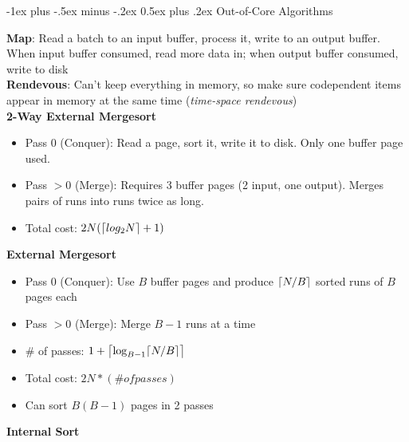 \documentclass[10pt,landscape]{article}
\makeatletter
\DeclarePairedDelimiter{\ceil}{\lceil}{\rceil}
\renewcommand{\section}{\@startsection{section}{1}{0mm}%
                                {-1ex plus -.5ex minus -.2ex}%
                                {0.5ex plus .2ex}%
                                {\normalfont\large\bfseries}}
\makeatother
\begin{document}
\raggedright
\footnotesize
\begin{multicols}{3}


\setlength{\premulticols}{1pt}
\setlength{\postmulticols}{1pt}
\setlength{\multicolsep}{1pt}
\setlength{\columnsep}{2pt}


\section{Out-of-Core Algorithms}

\textbf{Map}: Read a batch to an input buffer, process it, write to an output buffer. When input buffer consumed, read more data in; when output buffer consumed, write to disk \\
\textbf{Rendevous}: Can't keep everything in memory, so make sure codependent items appear in memory at the same time (\textit{time-space rendevous}) \\

\textbf{2-Way External Mergesort}

\begin{itemize}
    \item Pass 0 (Conquer): Read a page, sort it, write it to disk. Only one buffer page used.
    \item Pass $>0$ (Merge): Requires 3 buffer pages (2 input, one output). Merges pairs of runs into runs twice as long.
    \item Total cost: $2N(\ceil*{log_2 N} + 1)$
\end{itemize}


\textbf{External Mergesort}

\begin{itemize}
    \item Pass 0 (Conquer): Use $B$ buffer pages and produce $\ceil*{N/B}$ sorted runs of $B$ pages each
    \item Pass $>0$ (Merge): Merge $B-1$ runs at a time
    \item \# of passes: $1+\ceil*{\log_{B-1}\ceil*{N/B}}$
    \item Total cost: $2N * (\# of passes)$
    \item Can sort $B(B-1)$ pages in 2 passes
\end{itemize}

\textbf{Internal Sort}


\end{multicols}
\end{document}

